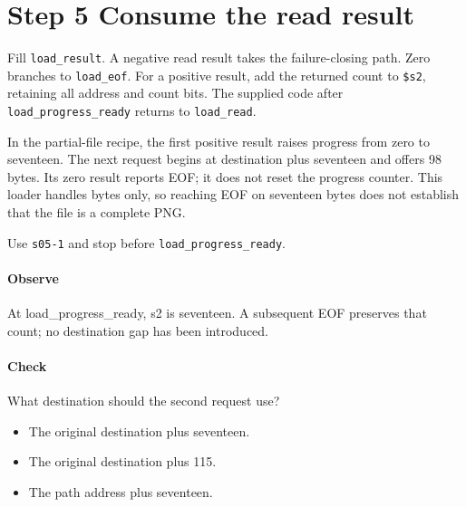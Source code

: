 \section{Step 5 Consume the read result}\label{png-load-s05}
Fill \texttt{load\_result}. A negative read result takes the failure-closing path. Zero branches to \texttt{load\_eof}. For a positive result, add the returned count to \texttt{\$s2}, retaining all address and count bits. The supplied code after \texttt{load\_progress\_ready} returns to \texttt{load\_read}.

In the partial-file recipe, the first positive result raises progress from zero to seventeen. The next request begins at destination plus seventeen and offers 98 bytes. Its zero result reports EOF; it does not reset the progress counter. This loader handles bytes only, so reaching EOF on seventeen bytes does not establish that the file is a complete PNG.

Use \texttt{s05-1} and stop before \texttt{load\_progress\_ready}.

\paragraph{Observe} At load\_progress\_ready, s2 is seventeen. A subsequent EOF preserves that count; no destination gap has been introduced.

\paragraph{Check} What destination should the second request use?
\begin{itemize}
\item[A.] The original destination plus seventeen.
\item[B.] The original destination plus 115.
\item[C.] The path address plus seventeen.
\end{itemize}
